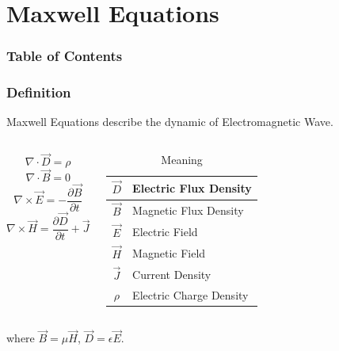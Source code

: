 \documentclass{beamer}
\begin{document}
\section{Maxwell Equations}


\begin{frame}
    \frametitle{Table of Contents}
    \tableofcontents[currentsection]
\end{frame}


\begin{frame}
    \frametitle{Definition}
    Maxwell Equations describe the dynamic of Electromagnetic Wave.
    \begin{columns}

        \begin{equation}
            \nabla \cdot \vec{D} = \rho
        \end{equation}
        \begin{equation}
            \nabla \cdot \vec{B} = 0
        \end{equation}
        \begin{equation}
            \nabla \times \vec{E} = - \frac{\partial{\vec{B}}}{\partial{t}}
        \end{equation}
        \begin{equation}
            \nabla \times \vec{H} = \frac{\partial{\vec{D}}}{\partial{t}} + \vec{J}
        \end{equation}

        \begin{table}[h]
            \centering
            \caption{Meaning}
            \begin{tabular}{|c|l|}
                \hline
                $\vec{D}$ & Electric Flux Density   \\\hline
                $\vec{B}$ & Magnetic Flux Density   \\\hline
                $\vec{E}$ & Electric Field          \\\hline
                $\vec{H}$ & Magnetic Field          \\\hline
                $\vec{J}$ & Current Density         \\\hline
                $\rho$    & Electric Charge Density \\
                \hline
            \end{tabular}
        \end{table}

    \end{columns}

    \vspace{5mm}
    where $\vec{B} = \mu \vec{H}$, $\vec{D} = \epsilon \vec{E}$.
\end{frame}
\end{document}
